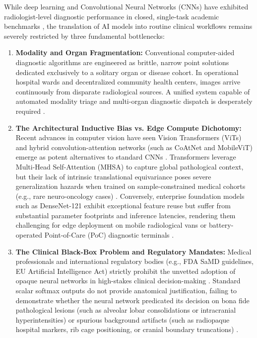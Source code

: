 \documentclass[journal]{IEEEtran}
\begin{document}
While deep learning and Convolutional Neural Networks (CNNs) have exhibited radiologist-level diagnostic performance in closed, single-task academic benchmarks \cite{esteva2017dermatologist, he2016deep}, the translation of AI models into routine clinical workflows remains severely restricted by three fundamental bottlenecks:
\begin{enumerate}
    \item \textbf{Modality and Organ Fragmentation:} Conventional computer-aided diagnostic algorithms are engineered as brittle, narrow point solutions dedicated exclusively to a solitary organ or disease cohort. In operational hospital wards and decentralized community health centers, images arrive continuously from disparate radiological sources. A unified system capable of automated modality triage and multi-organ diagnostic dispatch is desperately required \cite{litjens2017survey}.
    \item \textbf{The Architectural Inductive Bias vs. Edge Compute Dichotomy:} Recent advances in computer vision have seen Vision Transformers (ViTs) and hybrid convolution-attention networks (such as CoAtNet and MobileViT) emerge as potent alternatives to standard CNNs \cite{dosovitskiy2020vit, dai2021coatnet, mehta2021mobilevit}. Transformers leverage Multi-Head Self-Attention (MHSA) to capture global pathological context, but their lack of intrinsic translational equivariance poses severe generalization hazards when trained on sample-constrained medical cohorts (e.g., rare neuro-oncology cases) \cite{raghu2021vision}. Conversely, enterprise foundation models such as DenseNet-121 exhibit exceptional feature reuse but suffer from substantial parameter footprints and inference latencies, rendering them challenging for edge deployment on mobile radiological vans or battery-operated Point-of-Care (PoC) diagnostic terminals \cite{huang2017densely}.
    \item \textbf{The Clinical Black-Box Problem and Regulatory Mandates:} Medical professionals and international regulatory bodies (e.g., FDA SaMD guidelines, EU Artificial Intelligence Act) strictly prohibit the unvetted adoption of opaque neural networks in high-stakes clinical decision-making \cite{amann2020explainability, tjoa2021survey}. Standard scalar softmax outputs do not provide anatomical justification, failing to demonstrate whether the neural network predicated its decision on bona fide pathological lesions (such as alveolar lobar consolidations or intracranial hyperintensities) or spurious background artifacts (such as radiopaque hospital markers, rib cage positioning, or cranial boundary truncations) \cite{degrave2021ai}.
\end{enumerate}
\end{document}
